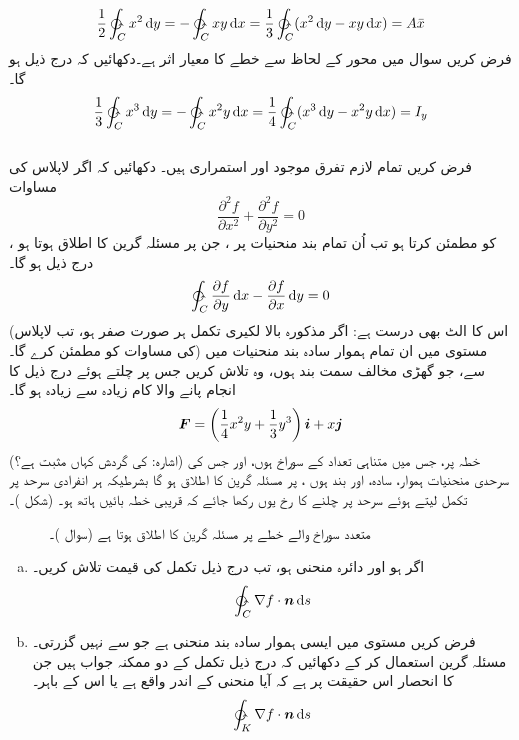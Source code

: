 \[\frac{1}{2}\ointctrclockwise_C x^2\dif y=-\ointctrclockwise_C xy\dif x=\frac{1}{3}\ointctrclockwise_C (x^2\dif y-xy\dif x) =A\bar{x}\]
فرض کریں سوال  میں  محور  کے لحاظ سے خطے کا معیار اثر  ہے۔دکھائیں کہ درج ذیل ہو گا۔
\[\frac{1}{3}\ointctrclockwise_C x^3\dif y=-\ointctrclockwise_C x^2y\dif x=\frac{1}{4}\ointctrclockwise_C (x^3\dif y-x^2y\dif x) =I_y\]
\\
فرض کریں تمام   لازم تفرق موجود اور استمراری ہیں۔ دکھائیں کہ اگر  لاپلاس کی مساوات
\[\frac{\partial^2 f}{\partial x^2}+\frac{\partial^2 f}{\partial y^2}=0\]
کو مطمئن کرتا ہو  تب اُن تمام بند منحنیات    پر ،  جن پر مسئلہ گرین کا اطلاق ہوتا ہو ، درج ذیل ہو گا۔
\[\ointctrclockwise_C \frac{\partial f}{\partial y}\dif x-\frac{\partial f}{\partial x}\dif y=0\]
(اس کا الٹ بھی درست ہے: اگر  مذکورہ بالا لکیری تکمل ہر صورت صفر ہو، تب  لاپلاس کی مساوات کو   مطمئن کرے گا۔)
مستوی میں ان تمام  ہموار سادہ بند منحنیات  میں سے، جو گھڑی مخالف سمت بند ہوں، وہ تلاش کریں جس پر چلتے ہوئے درج ذیل کا انجام   پانے والا کام زیادہ سے زیادہ ہو گا۔
\[{{\boldsymbol{F}}}=\left(\frac{1}{4}x^2y+\frac{1}{3}y^3\right){\boldsymbol{i}}+x{\boldsymbol{j}}\]
(اشارہ:  کی گردش کہاں مثبت ہے؟)
  خطہ   پر، جس میں متناہی تعداد کے سوراخ ہوں، اور جس کی سرحدی منحنیات ہموار، سادہ، اور بند ہوں ، پر مسئلہ گرین کا اطلاق ہو گا بشرطیکہ ہر انفرادی سرحد پر تکمل لیتے ہوئے سرحد پر چلنے کا رخ یوں رکھا جائے کہ قریبی خطہ بائیں ہاتھ ہو۔ (شکل )۔
\begin{figure}
\centering
{}
\caption
{متعدد سوراخ والے خطے پر مسئلہ گرین کا اطلاق ہوتا ہے (سوال )۔}
\label{شکل_سمتی_میدان_مسئلہ_گرین_سوراخ_متعدد}
\end{figure}
\begin{enumerate}[a.]
\item
اگر  ہو  اور   دائرہ  منحنی  ہو،  تب درج ذیل تکمل کی قیمت تلاش کریں۔
\[\ointctrclockwise_C \nabla f\cdot \an\dif s\]
\item
فرض کریں مستوی میں   ایسی   ہموار سادہ بند منحنی ہے جو   سے نہیں گزرتی۔ مسئلہ گرین استعمال کر کے دکھائیں کہ  درج ذیل  تکمل کے دو ممکنہ جواب ہیں جن  کا انحصار اس  حقیقت پر  ہے کہ آیا  منحنی  کے اندر  واقع ہے یا اس  کے  باہر۔
\[\ointctrclockwise_K \nabla f\cdot\an\dif s\]
\end{enumerate}
